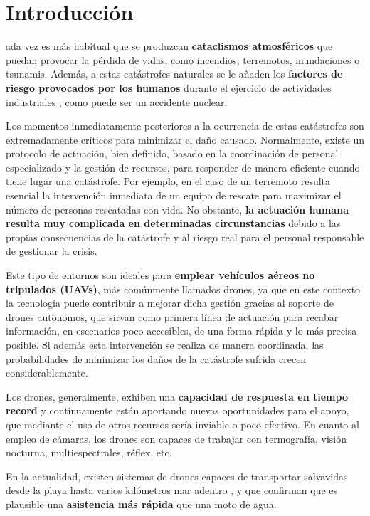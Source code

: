 \chapter{Introducción}
\label{chap:introduccion}

ada vez es más habitual que se produzcan \textbf{cataclismos atmosféricos} \cite{desastres} que puedan provocar la pérdida de vidas, como incendios, terremotos, inundaciones o tsunamis. Además, a estas catástrofes naturales se le añaden los \textbf{factores de riesgo provocados por los humanos} durante el ejercicio de actividades industriales \cite{desastres}, como puede ser un accidente nuclear.
  
Los momentos inmediatamente posteriores a la ocurrencia de estas catástrofes son extremadamente críticos para minimizar el daño causado. Normalmente, existe un protocolo de actuación, bien definido, basado en la coordinación de personal especializado y la gestión de recursos, para responder de manera eficiente cuando tiene lugar una catástrofe. Por ejemplo, en el caso de un terremoto resulta esencial la intervención inmediata de un equipo de rescate para maximizar el número de personas rescatadas con vida. No obstante, \textbf{la actuación humana resulta muy complicada en determinadas circunstancias} debido a las propias consecuencias de la catástrofe y al riesgo real para el personal responsable de gestionar la crisis.

Este tipo de entornos son ideales para \textbf{emplear vehículos aéreos no tripulados (\acs{UAV}s)}, más comúnmente llamados drones, ya que en este contexto la tecnología puede contribuir a mejorar dicha gestión gracias al soporte de drones autónomos, que sirvan como primera línea de actuación para recabar información, en escenarios poco accesibles, de una forma rápida y lo más precisa posible. Si además esta intervención se realiza de manera coordinada, las probabilidades de minimizar los daños de la catástrofe sufrida crecen considerablemente.

Los drones, generalmente, exhiben una \textbf{capacidad de respuesta en tiempo record} y continuamente están aportando nuevas oportunidades para el apoyo, que mediante el uso de otros recursos sería inviable o poco efectivo. En cuanto al empleo de cámaras, los drones son capaces de trabajar con termografía, visión nocturna, multiespectrales, réflex, etc.

En la actualidad, existen sistemas de drones capaces de transportar salvavidas desde la playa hasta varios kilómetros mar adentro \cite{dronsocorrista}, y que confirman que es plausible una \textbf{asistencia más rápida} que una moto de agua.\\

